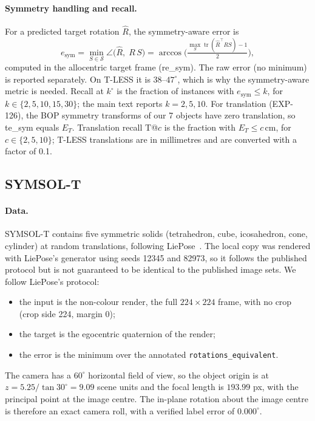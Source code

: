 \paragraph{Symmetry handling and recall.}
For a predicted target rotation $\hat R$, the symmetry-aware error is
\begin{equation*}
  e_{\text{sym}}=\min_{S\in\mathcal{S}}\angle\big(\hat R,\;R\,S\big)=\arccos\Big(\tfrac{\max_S\operatorname{tr}(\hat R^\top R S)-1}{2}\Big),
\end{equation*}
computed in the allocentric target frame (re\_sym). The raw error (no minimum) is reported separately. On T-LESS it is $38$--$47^\circ$, which is why the symmetry-aware metric is needed. Recall at $k^\circ$ is the fraction of instances with $e_{\text{sym}}\le k$, for $k\in\{2,5,10,15,30\}$; the main text reports $k=2,5,10$.
For translation (EXP-126), the BOP symmetry transforms of our 7 objects have zero translation, so te\_sym equals $E_T$. Translation recall T@$c$ is the fraction with $E_T\le c$\,cm, for $c\in\{2,5,10\}$; T-LESS translations are in millimetres and are converted with a factor of 0.1.

\subsection{SYMSOL-T}\label{app:symsolt}

\paragraph{Data.}
SYMSOL-T contains five symmetric solids (tetrahedron, cube, icosahedron, cone, cylinder) at random translations, following LiePose~\cite{hsiao2024liepose}. The local copy was rendered with LiePose's generator using seeds 12345 and 82973, so it follows the published protocol but is not guaranteed to be identical to the published image sets. We follow LiePose's protocol:
\begin{itemize}
  \item the input is the non-colour render, the full $224\times224$ frame, with no crop (crop side 224, margin 0);
  \item the target is the egocentric quaternion of the render;
  \item the error is the minimum over the annotated \texttt{rotations\_equivalent}.
\end{itemize}
The camera has a $60^\circ$ horizontal field of view, so the object origin is at $z=5.25/\tan30^\circ=9.09$ scene units and the focal length is $193.99$ px, with the principal point at the image centre. The in-plane rotation about the image centre is therefore an exact camera roll, with a verified label error of $0.000^\circ$.

